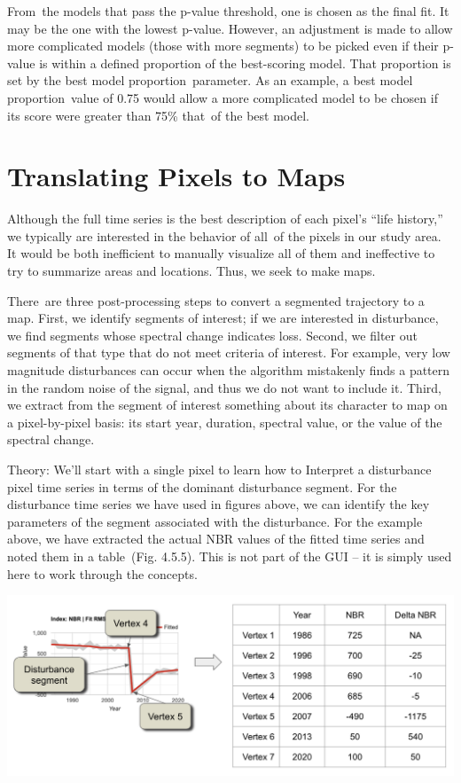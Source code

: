 \documentclass[
  letterpaper,
  DIV=11,
  numbers=noendperiod]{scrreprt}
\begin{document}
From~the models that pass the p-value threshold, one is chosen as the
final fit. It may be the one with the lowest p-value. However, an
adjustment is made to allow more complicated models (those with more
segments) to be picked even if their p-value is within a defined
proportion of the best-scoring model. That proportion is set by the best
model proportion~parameter. As an example, a best model proportion~value
of 0.75 would allow a more complicated model to be chosen if its score
were greater than 75\% that~of the best model.

\hypertarget{translating-pixels-to-maps}{%
\section{Translating Pixels to Maps}\label{translating-pixels-to-maps}}

Although the full time series is the best description of each pixel's
``life history,'' we typically are interested in the behavior of all~of
the pixels in our study area. It would be both inefficient to manually
visualize all of them and ineffective to try to summarize areas and
locations. Thus, we seek to make maps.

There~are three post-processing steps to convert a segmented trajectory
to a map. First, we identify segments of interest; if we are interested
in disturbance, we find segments whose spectral change indicates loss.
Second, we filter out segments of that type that do not meet criteria of
interest. For example, very low magnitude disturbances can occur when
the algorithm mistakenly finds a pattern in the random noise of the
signal, and thus we do not want to include it. Third, we extract from
the segment of interest something about its character to map on a
pixel-by-pixel basis: its start year, duration, spectral value, or the
value of the spectral change.

Theory: We'll start with a single pixel to learn how to Interpret a
disturbance pixel time series in terms of the dominant disturbance
segment. For the disturbance time series we have used in figures above,
we can identify the key parameters of the segment associated with the
disturbance. For the example above, we have extracted the actual NBR
values of the fitted time series and noted them in a table~(Fig. 4.5.5).
This is not part of the GUI -- it is simply used here to work through
the concepts.

\includegraphics{./F4/image84.png}
\end{document}
